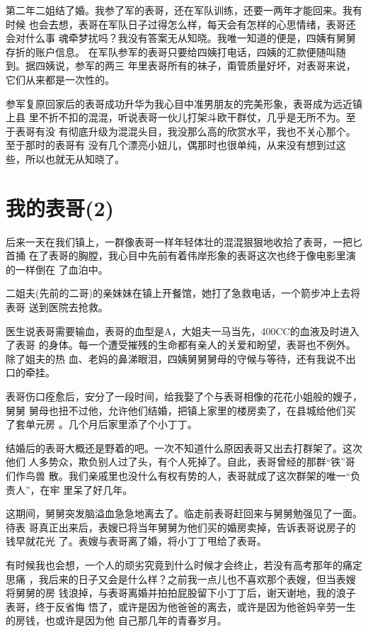 \documentclass[12pt]{book}
\begin{document}
第二年二姐结了婚。我参了军的表哥，还在军队训练，还要一两年才能回来。我有时候
也会去想，表哥在军队日子过得怎么样，每天会有怎样的心思情绪，表哥还会对什么事
魂牵梦扰吗？我没有答案无从知晓。我唯一知道的便是，四姨有舅舅存折的账户信息。
在军队参军的表哥只要给四姨打电话，四姨的汇款便随叫随到。据四姨说，参军的两三
年里表哥所有的袜子，甭管质量好坏，对表哥来说，它们从来都是一次性的。

参军复原回家后的表哥成功升华为我心目中准男朋友的完美形象，表哥成为远近镇上县
里不折不扣的混混，听说表哥一伙儿打架斗欧干群仗，几乎是无所不为。至于表哥有没
有彻底升级为混混头目，我没那么高的欣赏水平，我也不关心那个。至于那时的表哥有
没有几个漂亮小妞儿，偶那时也很单纯，从来没有想到过这些，所以也就无从知晓了。
\section{我的表哥(2)}
\label{sec-9-22}

后来一天在我们镇上，一群像表哥一样年轻体壮的混混狠狠地收拾了表哥，一把匕首捅
在了表哥的胸膛，我心目中先前有着伟岸形象的表哥这次也终于像电影里演的一样倒在
了血泊中。

二姐夫(先前的二哥)的亲妹妹在镇上开餐馆，她打了急救电话，一个箭步冲上去将表哥
送到医院去抢救。

医生说表哥需要输血，表哥的血型是A，大姐夫一马当先，400CC的血液及时进入了表哥
的身体。每一个遭受摧残的生命都有亲人的关爱和盼望，表哥也不例外。除了姐夫的热
血、老妈的鼻涕眼泪，四姨舅舅舅母的守候与等待，还有我说不出口的牵挂。

表哥伤口痊愈后，安分了一段时间，给我娶了个与表哥相像的花花小姐般的嫂子，舅舅
舅母也扭不过他，允许他们结婚，把镇上家里的楼房卖了，在县城给他们买了套单元房
。几个月后家里添了个小丁丁。

结婚后的表哥大概还是野着的吧。一次不知道什么原因表哥又出去打群架了。这次他们
人多势众，欺负别人过了头，有个人死掉了。自此，表哥曾经的那群“铁”哥们作鸟兽
散。我们亲戚里也没什么有权有势的人，表哥就成了这次群架的唯一“负责人”，在牢
里呆了好几年。

这期间，舅舅突发脑溢血急急地离去了。临走前表哥赶回来与舅舅勉强见了一面。待表
哥真正出来后，表嫂已将当年舅舅为他们买的婚房卖掉，告诉表哥说房子的钱早就花光
了。表嫂与表哥离了婚，将小丁丁甩给了表哥。

有时候我也会想，一个人的顽劣究竟到什么时候才会终止，若没有高考那年的痛定思痛
，我后来的日子又会是什么样？之前我一点儿也不喜欢那个表嫂，但当表嫂将舅舅的房
钱浪掉，与表哥离婚并拍拍屁股留下小丁丁后，谢天谢地，我的浪子表哥，终于反省悔
悟了，或许是因为他爸爸的离去，或许是因为他爸妈辛劳一生的房钱，也或许是因为他
自己那几年的青春岁月。
\end{document}
